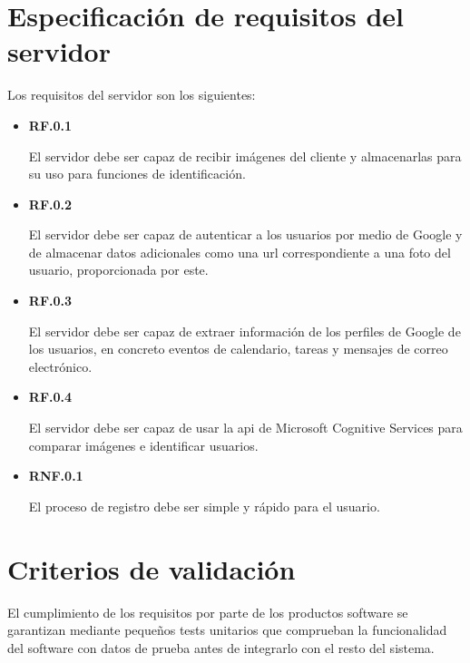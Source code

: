 \section{Especificación de requisitos del servidor}

Los requisitos del servidor son los siguientes:

\begin{itemize}
	\item \textbf{RF.0.1}

	El servidor debe ser capaz de recibir imágenes del cliente y almacenarlas para su uso para funciones de identificación.

	\item \textbf{RF.0.2}

	El servidor debe ser capaz de autenticar a los usuarios por medio de Google y de almacenar datos adicionales como una \acrshort{url} correspondiente a una foto del usuario, proporcionada por este.

	\item \textbf{RF.0.3}

	El servidor debe ser capaz de extraer información de los perfiles de Google de los usuarios, en concreto eventos de calendario, tareas y mensajes de correo electrónico.

	\item \textbf{RF.0.4}

	El servidor debe ser capaz de usar la \acrshort{api} de Microsoft Cognitive Services para comparar imágenes e identificar usuarios.

	\item \textbf{RNF.0.1}
	
	El proceso de registro debe ser simple y rápido para el usuario.
	
\end{itemize}

\section{Criterios de validación}

El cumplimiento de los requisitos por parte de los productos software se garantizan mediante pequeños tests unitarios que comprueban la funcionalidad del software con datos de prueba antes de integrarlo con el resto del sistema.
